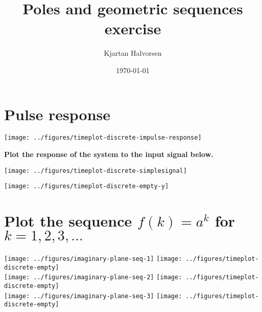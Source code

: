 \documentclass[letterpaper]{scrartcl}
\author{Kjartan Halvorsen}
\date{\today}
\title{Poles and geometric sequences exercise}
\begin{document}
\maketitle


\section*{Pulse response}
\label{sec-1}
\begin{center}
\begin{minipage}[t]{0.5\linewidth}
\centering
{}
\end{minipage}
\texttt{[image: ../figures/timeplot-discrete-impulse-response]}
\end{center}

\textbf{Plot the response of the system to the input signal below.}

\texttt{[image: ../figures/timeplot-discrete-simplesignal]}

\vspace*{1cm}

\texttt{[image: ../figures/timeplot-discrete-empty-y]}



\newpage

\section*{Plot the sequence \(f(k) = a^k\) for \(k=1,2,3,\ldots\)}
\label{sec-2}

\begin{center}
\texttt{[image: ../figures/imaginary-plane-seq-1]}
\texttt{[image: ../figures/timeplot-discrete-empty]}\\
\texttt{[image: ../figures/imaginary-plane-seq-2]}
\texttt{[image: ../figures/timeplot-discrete-empty]}\\
\texttt{[image: ../figures/imaginary-plane-seq-3]}
\texttt{[image: ../figures/timeplot-discrete-empty]}\\
\end{center}
\end{document}
